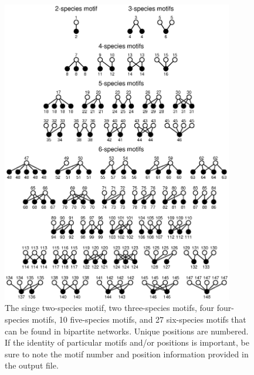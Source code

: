 \documentclass[12pt]{article}
\begin{document}
	\begin{figure}[ht]
	  \centering
		\includegraphics*[width=0.9\textwidth]{bipartite_motifs.eps}
			  \vspace{0.5cm}
		\caption{The singe two-species motif, two three-species motifs, four four-species motifs, 10 five-species motifs, and 27 six-species motifs that can be found in bipartite networks. Unique positions are numbered. If the identity of particular motifs and/or positions is important, be sure to note the motif number and position information provided in the output file.}
		\label{bipartite_motifs}
	\end{figure}

\clearpage




\clearpage
\end{document}
